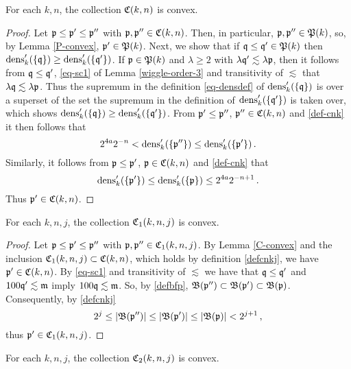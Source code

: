 {\begin{lemma}[C convex]
    \label{C-convex}
    For each $k,n$, the collection ${\mathfrak C}(k,n)$ is convex.
\end{lemma}

\begin{proof}
    Let ${\mathfrak p} \le {\mathfrak p}' \le {\mathfrak p}''$ with ${\mathfrak p}, {\mathfrak p}'' \in {\mathfrak C}(k,n)$. Then, in particular, ${\mathfrak p}, {\mathfrak p}'' \in {\mathfrak P}(k)$, so, by Lemma \ref{P-convex}, ${\mathfrak p}' \in {\mathfrak P}(k)$. Next, we show that if ${\mathfrak q} \le {\mathfrak q}' \in {\mathfrak P}(k)$ then $\operatorname{\operatorname{dens}}'_k(\{{\mathfrak q}\}) \ge \operatorname{\operatorname{dens}}_k'(\{{\mathfrak q}'\})$. If ${\mathfrak p} \in {\mathfrak P}(k)$ and $\lambda \ge 2$ with $\lambda {\mathfrak q}' \lesssim \lambda {\mathfrak p}$, then it follows from ${\mathfrak q} \le {\mathfrak q}'$, \eqref{eq-sc1} of Lemma \ref{wiggle-order-3} and transitivity of $\lesssim$ that $\lambda {\mathfrak q} \lesssim \lambda {\mathfrak p}$. Thus the supremum in the definition \eqref{eq-densdef} of $\operatorname{\operatorname{dens}}_k'(\{{\mathfrak q}\})$ is over a superset of the set the  supremum in the definition of $\operatorname{\operatorname{dens}}_k'(\{{\mathfrak q}'\})$ is taken over, which shows $\operatorname{\operatorname{dens}}'_k(\{{\mathfrak q}\}) \ge \operatorname{\operatorname{dens}}_k'(\{{\mathfrak q}'\})$. From ${\mathfrak p}' \le {\mathfrak p}''$, ${\mathfrak p}'' \in {\mathfrak C}(k,n)$ and \eqref{def-cnk} it then follows that
    $$
        2^{4a}2^{-n} < \operatorname{\operatorname{dens}}_k'(\{{\mathfrak p}''\}) \le \operatorname{\operatorname{dens}}_k'(\{{\mathfrak p}'\})\,.
    $$
    Similarly, it follows from ${\mathfrak p} \le {\mathfrak p}'$, ${\mathfrak p} \in {\mathfrak C}(k,n)$ and \eqref{def-cnk} that
    $$
        \operatorname{\operatorname{dens}}_k'(\{{\mathfrak p}'\}) \le \operatorname{\operatorname{dens}}_k'(\{{\mathfrak p}\}) \le 2^{4a}2^{-n+1}\,.
    $$
    Thus ${\mathfrak p}' \in {\mathfrak C}(k,n)$.
\end{proof}

\begin{lemma}[C1 convex]
    \label{C1-convex}
    For each $k,n,j$, the collection ${\mathfrak C}_1(k,n,j)$ is convex.
\end{lemma}

\begin{proof}
    Let ${\mathfrak p}\le{\mathfrak p}'\le{\mathfrak p}''$ with ${\mathfrak p}, {\mathfrak p}'' \in {\mathfrak C}_1(k,n,j)$. By Lemma \ref{C-convex} and the inclusion ${\mathfrak C}_1(k,n,j) \subset {\mathfrak C}(k,n)$, which holds by definition \eqref{defcnkj}, we have ${\mathfrak p}' \in {\mathfrak C}(k,n)$. By \eqref{eq-sc1} and transitivity of $\lesssim$ we have that ${\mathfrak q} \le {\mathfrak q}'$ and $100 {\mathfrak q}' \lesssim \mathfrak{m}$ imply $100 {\mathfrak q} \lesssim \mathfrak{m}$. So, by \eqref{defbfp}, $\mathfrak{B}({\mathfrak p}'') \subset \mathfrak{B}({\mathfrak p}') \subset \mathfrak{B}({\mathfrak p})$. Consequently, by \eqref{defcnkj}
    $$
        2^j \le |\mathfrak{B}({\mathfrak p}'')|\le |\mathfrak{B}({\mathfrak p}')| \le |\mathfrak{B}({\mathfrak p})| < 2^{j+1}\,,
    $$
    thus ${\mathfrak p}' \in {\mathfrak C}_1(k,n,j)$.
\end{proof}

\begin{lemma}[C2 convex]
    \label{C2-convex}
    For each $k,n,j$, the collection ${\mathfrak C}_2(k,n,j)$ is convex.
\end{lemma}

}
